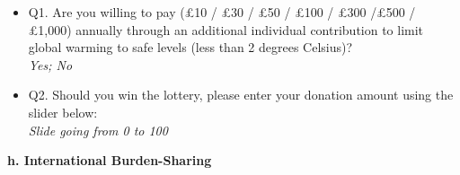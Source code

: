 \documentclass{article}
\begin{document}
\begin{itemize}
    \item Q1. Are you willing to pay (£10 / £30 / £50 / £100 / £300 /£500 / £1,000) annually through an additional individual contribution to limit global warming to safe levels (less than 2 degrees Celsius)?  \\
    \textit{Yes; No}
    \item Q2. Should you win the lottery, please enter your donation amount using the slider below: \\
    \textit{Slide going from 0 to 100}
\end{itemize}

\begin{flushleft}
\textbf{h. International Burden-Sharing}
\end{flushleft}
\end{document}
